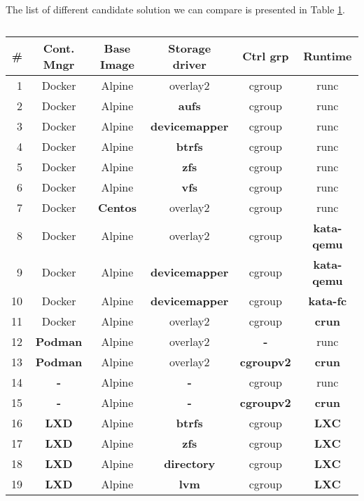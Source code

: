 The list of different candidate solution we can compare is presented in Table \ref{tab:candidates}.

\begin{table}[!h]
  \begin{center}
    \begin{tabular}{|r|c|c|c|c|c|}
      \hline
      \textbf{\#} & \textbf{Cont. Mngr} & \textbf{Base Image} & \textbf{Storage driver} & \textbf{Ctrl grp} & \textbf{Runtime} \\ \hline \hline
       1  & Docker & Alpine & overlay2 & cgroup & runc \\ \hline \hline
       2  & Docker & Alpine & \textbf{aufs} & cgroup & runc \\ \hline
       3  & Docker & Alpine & \textbf{devicemapper} & cgroup & runc \\ \hline
       4  & Docker & Alpine & \textbf{btrfs} & cgroup & runc \\ \hline
       5  & Docker & Alpine & \textbf{zfs} & cgroup & runc \\ \hline
       6  & Docker & Alpine & \textbf{vfs} & cgroup & runc \\ \hline
       7  & Docker & \textbf{Centos} & overlay2 & cgroup & runc \\ \hline
       8  & Docker & Alpine & overlay2 & cgroup & \textbf{kata-qemu} \\ \hline
       9  & Docker & Alpine & \textbf{devicemapper} & cgroup & \textbf{kata-qemu} \\ \hline
       10 & Docker & Alpine & \textbf{devicemapper} & cgroup & \textbf{kata-fc} \\ \hline
       11 & Docker & Alpine & overlay2 & cgroup & \textbf{crun} \\ \hline
       12 & \textbf{Podman} & Alpine & overlay2 & \textbf{-} & runc \\ \hline
       13 & \textbf{Podman} & Alpine & overlay2 & \textbf{cgroupv2} & \textbf{crun} \\ \hline
       14 & \textbf{-} & Alpine & \textbf{-} & cgroup & runc \\ \hline
       15 & \textbf{-} & Alpine & \textbf{-} & \textbf{cgroupv2} & \textbf{crun} \\ \hline
       16 & \textbf{LXD} & Alpine & \textbf{btrfs} & cgroup & \textbf{LXC} \\ \hline
       17 & \textbf{LXD} & Alpine & \textbf{zfs} & cgroup & \textbf{LXC} \\ \hline
       18 & \textbf{LXD} & Alpine & \textbf{directory} & cgroup & \textbf{LXC} \\ \hline
       19 & \textbf{LXD} & Alpine & \textbf{lvm} & cgroup & \textbf{LXC} \\ \hline
    \end{tabular}
  \end{center}
  \caption{}
  \label{tab:candidates}
\end{table}

